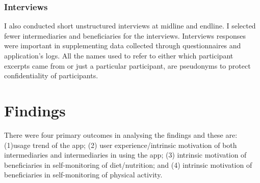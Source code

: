 \subsubsection{Interviews}
I also conducted short unstructured interviews at midline and endline. I selected fewer intermediaries and beneficiaries for the interviews. Interviews responses were important in supplementing data collected through questionnaires and application's logs. All the names used to refer to either which participant excerpts came from or just a particular participant, are pseudonyms to protect confidentiality of participants.
\section{Findings}
There were four primary outcomes in analysing the findings and these are: (1)usage trend of the app; (2) user experience/intrinsic motivation  of both intermediaries and intermediaries in using the app; (3) intrinsic motivation of beneficiaries in self-monitoring of diet/nutrition; and (4) intrinsic motivation of beneficiaries in self-monitoring of physical activity.
